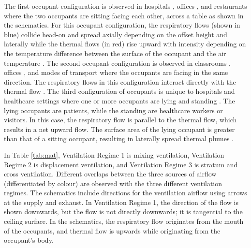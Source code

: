\documentclass[a4paper,12pt]{elsarticle}
\begin{document}
The first occupant configuration is observed in hospitals \cite{zhou2021experimental}, offices \cite{li2023numerical}, and restaurants \cite{oksanen2022combining} where the two occupants are sitting facing each other, across a table as shown in the schematics. For this occupant configuration, the respiratory flows (shown in blue) collide head-on and spread axially depending on the offset height and laterally \cite{giri2022colliding, singhal2022virus} while the thermal flows (in red) rise upward with intensity depending on the temperature difference between the surface of the occupant and the air temperature \cite{zhang2019distribution}. The second occupant configuration is observed in classrooms \cite{qin2023transmission}, offices \cite{he2011cfd}, and modes of transport \cite{yan2021transmission,ho2021modeling} where the occupants are facing in the same direction. The respiratory flows in this configuration interact directly with the thermal flow \cite{ou2022insufficient}. The third configuration of occupants is unique to hospitals and healthcare settings where one or more occupants are lying and standing \cite{villafruela2019assessment, lu2020reducing}. The lying occupants are patients, while the standing are healthcare workers or visitors. In this case, the respiratory flow is parallel to the thermal flow, which results in a net upward flow. The surface area of the lying occupant is greater than that of a sitting occupant, resulting in laterally spread thermal plumes \cite{feng2020influence}.

In Table \ref{tab:mat}, Ventilation Regime 1 is mixing ventilation, Ventilation Regime 2 is displacement ventilation, and Ventilation Regime 3 is stratum and cross ventilation. Different overlaps between the three sources of airflow (differentiated by colour) are observed with the three different ventilation regimes. The schematics include directions for the ventilation airflow using arrows at the supply and exhaust. In Ventilation Regime 1, the direction of the flow is shown downwards, but the flow is not directly downwards; it is tangential to the ceiling surface. In the schematics, the respiratory flow originates from the mouth of the occupants, and thermal flow is upwards while originating from the occupant's body. 
\end{document}
